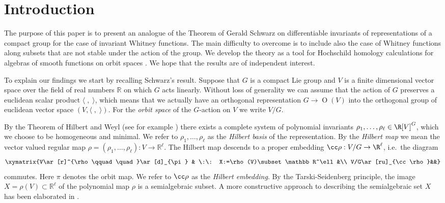 \section{Introduction} \label{sec:intro}

The purpose of this paper  is to present an analogue of the Theorem of Gerald Schwarz \cite[Theorem 1]{SchwaSFIACLG} on differentiable invariants of representations of a compact group for the case of invariant Whitney functions. The main difficulty to overcome is to include 
also the case of Whitney functions along subsets that are not stable under the action of the group. We develop the theory as a tool for Hochschild homology calculations for algebras of smooth functions on orbit spaces \cite{HerPflHHASFOS}. We hope that the results are of independent interest.

To explain our findings we start by recalling Schwarz's result. 
Suppose that $G$ is a compact Lie group and $V$ is a finite dimensional vector space over the field of real numbers $\mathbb R$ on which $G$ acts linearly. Without loss of generality we can assume that the action of $G$ preserves a euclidean scalar product $\langle\;,\;\rangle$, which means that we actually have an 
orthogonal representation $G\to \operatorname O(V)$ into the orthogonal group of euclidean vector space $(V,\langle\;,\;\rangle)$. For the  \emph{orbit space} of the $G$-action on $V$ we write $V/G$. 

By the Theorem of Hilbert and Weyl (see for example \cite[\S 98] {ZelCLGR}) there exists a complete system of polynomial invariants $\rho_1,\dots ,\rho_\ell\in \R[V]^G$, which we choose to be homogeneous and minimal. We refer to $\rho_1,\dots ,\rho_\ell$ as the \emph{Hilbert basis} of the representation. By the \emph{Hilbert map} we mean the vector valued regular map $\rho=(\rho_1,\dots ,\rho_\ell): V\to \mathbb R^\ell$. 
The Hilbert map  descends to a proper embedding $\cc \rho: V/G\to \R^\ell$, i.e.~the diagram 
\begin{eqnarray*}
\xymatrix{V\ar[r]^{\rho\qquad\quad}\ar[d]_{\pi}  & \:\: 
  X:=\rho(V)\subset \mathbb R^\ell&\\
  V/G\ar[ru]_{\cc\rho}&&}
\end{eqnarray*}
commutes. Here $\pi$ denotes the orbit map. We refer to $\cc\rho$ as the \emph{Hilbert embedding}.
By the Tarski-Seidenberg principle, the image 
$X=\rho(V)\subset \mathbb R^\ell$ of the polynomial map $\rho$ is a semialgebraic subset. A more constructive approach to describing the semialgebraic set $X$ has been elaborated in \cite{ProSchIDOS}.

